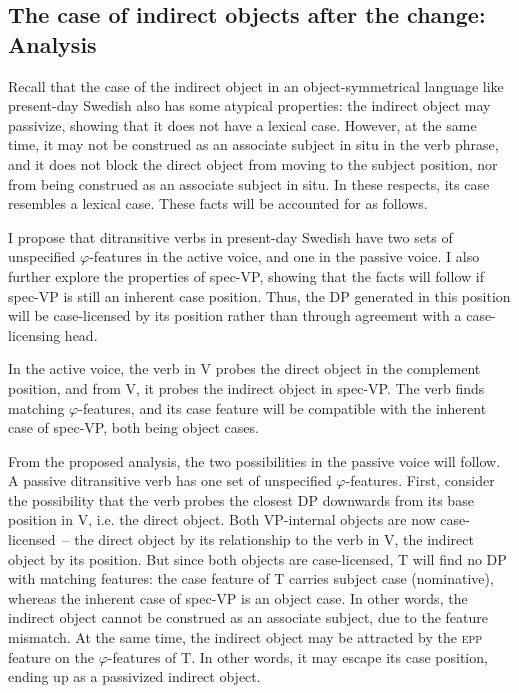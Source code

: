 \documentclass[output=paper]{langscibook}
\begin{document}
\subsection{The case of indirect objects after the change: Analysis}\label{sec:falk:4.3}


Recall that the case of the indirect object in an object-symmetrical language like present-day Swedish also has some atypical properties: the indirect object may passivize, showing that it does not have a lexical case. However, at the same time, it may not be construed as an associate subject in situ in the verb phrase, and it does not block the direct object from moving to the subject position, nor from being construed as an associate subject in situ. In these respects, its case resembles a lexical case. These facts will be accounted for as follows. 


I propose that ditransitive verbs in present-day Swedish have two sets of unspecified $\varphi $-features in the active voice, and one in the passive voice. I also further explore the properties of spec-VP, showing that the facts will follow if spec-VP is still an inherent case position. Thus, the DP generated in this position will be case-licensed by its position rather than through agreement with a case-licensing head.



In the active voice, the verb in V probes the direct object in the complement position, and from V, it probes the indirect object in spec-VP. The verb finds matching $\varphi $-features, and its case feature will be compatible with the inherent case of spec-VP, both being object cases.



From the proposed analysis, the two possibilities in the passive voice will follow. A passive ditransitive verb has one set of unspecified $\varphi $-features. First, consider the possibility that the verb probes the closest DP downwards from its base position in V, i.e. the direct object. Both VP-internal objects are now case-licensed~– the direct object by its relationship to the verb in V, the indirect object by its position. But since both objects are case-licensed, T will find no DP with matching features: the case feature of T carries subject case (nominative), whereas the inherent case of spec-VP is an object case. In other words, the indirect object cannot be construed as an associate subject, due to the feature mismatch. At the same time, the indirect object may be attracted by the \textsc{epp} feature on the $\varphi $-features of T. In other words, it may escape its case position, ending up as a passivized indirect object.
\end{document}
